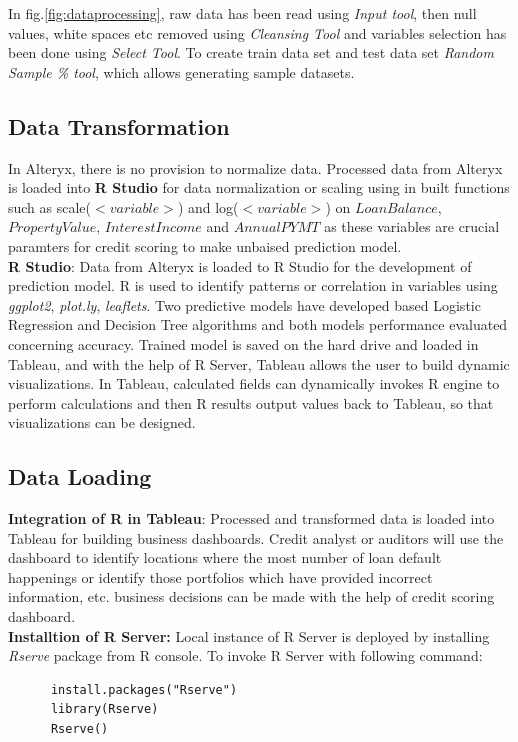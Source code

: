 In fig.\ref{fig:dataprocessing}, raw data has been read using \emph{Input tool}, then null values, white spaces etc removed using \emph{Cleansing Tool} and variables selection has been done using \emph{Select Tool}. To create train data set and test data set \emph{Random Sample \% tool}, which allows generating sample datasets.\\

\subsection{Data Transformation}
In Alteryx, there is no provision to normalize data. Processed data from Alteryx is loaded into \textbf{R Studio} for data normalization or scaling using in built functions such as scale($<variable>$) and log($<variable>$) on $LoanBalance$, $PropertyValue$, $InterestIncome$ and $AnnualPYMT$ as these variables are crucial paramters for credit scoring to make unbaised prediction model.\\

\textbf{R Studio}: Data from Alteryx is loaded to R Studio for the development of prediction model. R is used to identify patterns or correlation in variables using \emph{ggplot2}, \emph{plot.ly}, \emph{leaflets}. Two predictive models have developed based Logistic Regression and Decision Tree algorithms and both models performance evaluated concerning accuracy. Trained model is saved on the hard drive and loaded in Tableau, and with the help of R Server, Tableau allows the user to build dynamic visualizations. In Tableau, calculated fields can dynamically invokes R engine to perform calculations and then R results output values back to Tableau, so that visualizations can be designed.\\


\subsection{Data Loading}
\textbf{Integration of R in Tableau}: Processed and transformed data is loaded into Tableau for building business dashboards. Credit analyst or auditors will use the dashboard to identify locations where the most number of loan default happenings or identify those portfolios which have provided incorrect information, etc. business decisions can be made with the help of credit scoring dashboard.\\

\textbf{Installtion of R Server:} Local instance of R Server is deployed by installing \emph{Rserve} package from R console. To invoke R Server with following command:
      \begin{verbatim}
      install.packages("Rserve")
      library(Rserve)
      Rserve()
      \end{verbatim}

